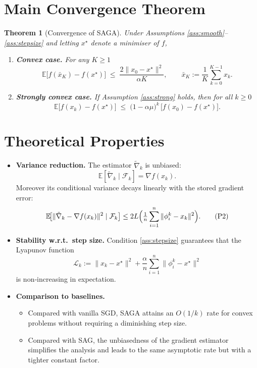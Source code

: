 \documentclass{article}
\newtheorem{theorem}{Theorem}
\newcommand{\E}{\mathbb{E}}
\newcommand{\grad}{\nabla}
\begin{document}
\section*{Main Convergence Theorem}
\begin{theorem}[Convergence of SAGA]\label{thm:conv}
Under Assumptions \ref{ass:smooth}–\ref{ass:stepsize} and letting $x^\star$ denote a minimiser of $f$,
\begin{enumerate}[label=(\roman*)]
\item \textbf{Convex case.} For any $K\ge 1$
\[
\E\!\bigl[f(\bar x_K)-f(x^\star)\bigr]\;\le\;
\frac{2\|x_0-x^\star\|^2}{\alpha K},
\qquad 
\bar x_K:=\frac{1}{K}\sum_{k=0}^{K-1}x_k .
\tag{7}
\]
\item \textbf{Strongly convex case.} If Assumption \ref{ass:strong} holds, then for all $k\ge 0$
\[
\E\!\bigl[f(x_k)-f(x^\star)\bigr]\;\le\;
\bigl(1-\alpha\mu\bigr)^{k}\,\bigl[f(x_0)-f(x^\star)\bigr].
\tag{8}
\]
\end{enumerate}
\end{theorem}

\section*{Theoretical Properties}
\begin{itemize}
\item \textbf{Variance reduction.} The estimator $\tilde\nabla_k$ is unbiased:
\[
\E[\tilde\nabla_k\mid\mathcal{F}_k]=\grad f(x_k).
\tag{P1}
\]
Moreover its conditional variance decays linearly with the stored gradient error:
\[
\E\!\bigl[\|\tilde\nabla_k-\grad f(x_k)\|^2\mid\mathcal{F}_k\bigr]
\le 2L\Bigl(\tfrac{1}{n}\sum_{i=1}^n\| \phi_i^k-x_k\|^2\Bigr).
\tag{P2}
\]

\item \textbf{Stability w.r.t.\ step size.} Condition \eqref{ass:stepsize} guarantees that the Lyapunov function
\[
\mathcal{L}_k:=\|x_k-x^\star\|^2+\frac{\alpha}{n}\sum_{i=1}^n\|\phi_i^k-x^\star\|^2
\tag{P3}
\]
is non‑increasing in expectation.

\item \textbf{Comparison to baselines.}
\begin{itemize}
\item Compared with vanilla SGD, SAGA attains an $O(1/k)$ rate for convex problems without requiring a diminishing step size.
\item Compared with SAG, the unbiasedness of the gradient estimator simplifies the analysis and leads to the same asymptotic rate but with a tighter constant factor.
\end{itemize}
\end{itemize}
\end{document}
